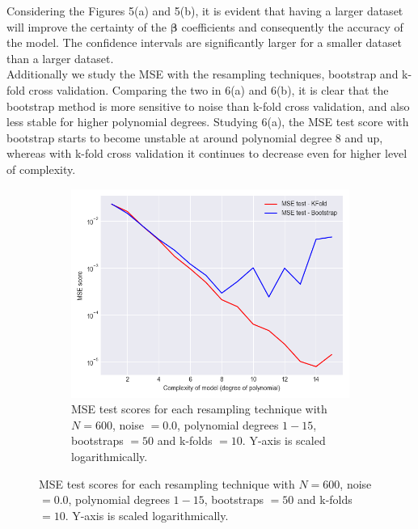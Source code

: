 \documentclass[a4paper,twocolumn]{article}
\newcommand{\B}{\boldsymbol{\beta}}
\begin{document}
Considering the Figures 5(a) and 5(b), it is evident that having a larger dataset will improve the certainty of the $\B$ coefficients and consequently the accuracy of the model. The confidence intervals are significantly larger for a smaller dataset than a larger dataset.\\
Additionally we study the MSE with the resampling techniques, bootstrap and k-fold cross validation. Comparing the two in 6(a) and 6(b), it is clear that the bootstrap method is more sensitive to noise than k-fold cross validation, and also less stable for higher polynomial degrees. Studying 6(a), the MSE test score with bootstrap starts to become unstable at around polynomial degree 8 and up, whereas with k-fold cross validation it continues to decrease even for higher level of complexity.
\begin{figure}[ht]
    \centering
    \begin{subfigure}[b]{0.9\columnwidth}
        \includegraphics[width=\columnwidth]{kfold_vs_bootstrap_Bootstraps=50,KFolds=10_N=600_Noise=0.0_Degree=1-15.png}
        \caption{MSE test scores for each resampling technique with $N = 600$, noise $= 0.0$, polynomial degrees $1- 15$, bootstraps $= 50$ and k-folds $= 10$. Y-axis is scaled logarithmically.}
    \end{subfigure}
    

\end{figure}
\end{document}
